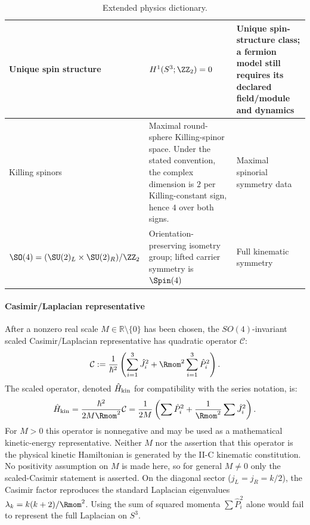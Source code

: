 \documentclass[11pt,a4paper]{article}
\begin{document}
\begin{table}[!htbp]
\begin{tabular}{|
  L{3.6cm}|
  L{4.3cm}|
  L{\dimexpr\linewidth-3.6cm-4.3cm-6\arrayrulewidth\relax}|
}
Unique spin structure
& \(H^1(S^3;\ZZ_2)=0\)
& Unique spin-structure class; a fermion model still requires its declared
  field/module and dynamics \\
\hline

Killing spinors
& Maximal round-sphere Killing-spinor space.  Under the stated convention, the
  complex dimension is \(2\) per Killing-constant sign, hence \(4\) over both
  signs.
& Maximal spinorial symmetry data \\
\hline

\(\SO(4)=(\SU(2)_L\times\SU(2)_R)/\ZZ_2\)
& Orientation-preserving isometry group; lifted carrier symmetry is
  \(\Spin(4)\)
& Full kinematic symmetry \\
\hline

\end{tabular}

\caption[Extended physics dictionary]{Extended physics dictionary.}
\label{p2:tab:physics-dictionary2}
\endgroup
\end{table}



\paragraph{Casimir/Laplacian representative}
After a nonzero real scale \(M\in\mathbb R\setminus\{0\}\) has been chosen,
the \(SO(4)\)-invariant scaled Casimir/Laplacian representative has quadratic
operator \(\mathcal C\):
\[
\mathcal{C}:=\frac{1}{\hbar^2}\left(\sum_{i=1}^3 \hat{J}_i^2 + \Rmom^2\sum_{i=1}^3 \hat{P}_i^2\right).
\]
The scaled operator, denoted \(\hat H_{\rm kin}\) for compatibility with the
series notation, is:
\begin{equation}
\hat H_{\rm kin} = \frac{\hbar^2}{2M\Rmom^2} \mathcal{C}= \frac{1}{2M}\left(\sum \hat{P}_i^2 + \frac{1}{\Rmom^2}\sum \hat J_i^2\right).
\end{equation}
For \(M>0\) this operator is nonnegative and may be used as a mathematical
kinetic-energy representative.  Neither \(M\) nor the assertion that this
operator is the physical kinetic Hamiltonian is generated by the II-C
kinematic constitution.  No positivity assumption on \(M\) is made here, so
for general \(M\ne0\) only the scaled-Casimir statement is asserted.  On the
diagonal sector ($j_L = j_R = k/2$), the Casimir factor reproduces the
standard Laplacian eigenvalues $\lambda_k = k(k+2)/\Rmom^2$. Using the sum of
squared momenta $\sum \hat{P}_i^2$ alone would fail to represent the full
Laplacian on $S^3$.
\end{document}
